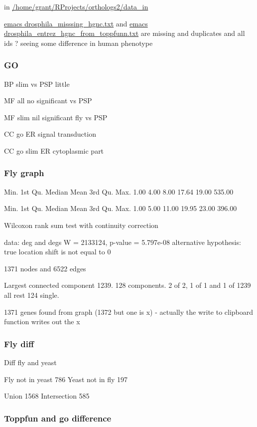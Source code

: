     in \url{/home/grant/RProjects/orthologs2/data_in}
    
    \url{emacs drosphila_misssing_hgnc.txt}
    and \url{emacs drosphila_entrez_hgnc_from_toppfunn.txt} are missing and duplicates and all ids
    ? seeing some difference in human phenotype
    
\subsubsection{GO}

BP slim vs PSP little

MF all no significant vs PSP

MF slim nil significant fly vs PSP

CC go ER signal transduction

CC go slim ER cytoplasmic part




\subsubsection{Fly graph}

 Min. 1st Qu.  Median    Mean 3rd Qu.    Max. 
   1.00    4.00    8.00   17.64   19.00  535.00 
   
  Min. 1st Qu.  Median    Mean 3rd Qu.    Max. 
   1.00    5.00   11.00   19.95   23.00  396.00 
   
   Wilcoxon rank sum test with continuity correction

data:  deg and degs
W = 2133124, p-value = 5.797e-08
alternative hypothesis: true location shift is not equal to 0

1371 nodes and 6522 edges

Largest connected component 1239. 128 components. 2 of 2, 1 of 1 and 1 of 1239 all rest 124 single. 
    
    1371 genes found from graph (1372 but one is x) - actually the write to clipboard function writes out the x
    

\subsubsection{Fly diff}
Diff fly and yeast

Fly not in yeast 786
Yeast not in fly 197 

Union 1568
Intersection 585 

\subsubsection{Toppfun and go difference}

